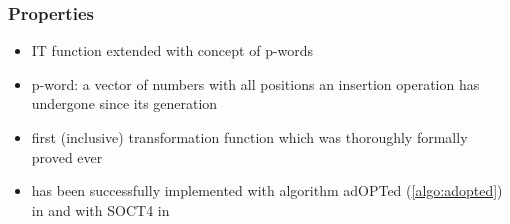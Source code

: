 \subsubsection{Properties}
\begin{itemize}
 \item IT function extended with concept of p-words
 \item p-word: a vector of numbers with all positions an insertion operation has undergone since its generation
 \item first (inclusive) transformation function which was thoroughly formally proved ever
 \item has been successfully implemented with algorithm adOPTed (\ref{algo:adopted}) in \cite{cicolini} and with SOCT4 in \cite{mosi}
\end{itemize}
